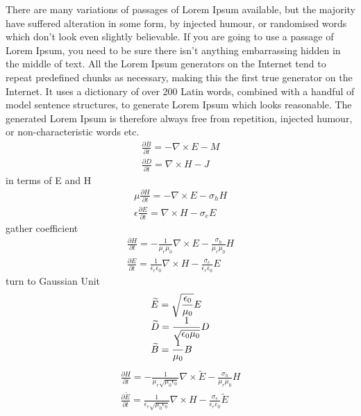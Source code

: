 There are many variations of passages of Lorem Ipsum available, but the majority have suffered alteration in some form,
by injected humour, or randomised words which don't look even slightly believable. If you are going to use a passage of
Lorem Ipsum, you need to be sure there isn't anything embarrassing hidden in the middle of text. All the Lorem Ipsum
generators on the Internet tend to repeat predefined chunks as necessary, making this the first true generator on the
Internet. It uses a dictionary of over 200 Latin words, combined with a handful of model sentence structures, to
generate Lorem Ipsum which looks reasonable. The generated Lorem Ipsum is therefore always free from repetition,
injected humour, or non-characteristic words etc.
\begin{gather}
    \frac{\partial B}{\partial t} =  - \nabla \times E - M\\
    \frac{\partial D}{\partial t} = \nabla \times H - J
\end{gather}
in terms of E and H
\begin{gather}
  \mu\frac{\partial H}{\partial t} = - \nabla \times E - \sigma_hH\\
  \epsilon\frac{\partial E}{\partial t} = \nabla \times H - \sigma_eE
\end{gather}
gather coefficient 
\begin{gather}
  \frac{\partial H}{\partial t} = - \frac{1}{\mu_r\mu_0}\nabla\times E - \frac{\sigma_h}{\mu_r\mu_0}H\\
  \frac{\partial E}{\partial t} = \frac{1}{\epsilon_r\epsilon_0}\nabla\times H - \frac{\sigma_e}{\epsilon_r\epsilon_0}E
\end{gather}
turn to Gaussian Unit 
\begin{equation}
  \label{eq:gaussian_unit}
  \begin{array}{@{}l@{}}
    {\displaystyle\widetilde{E} = \sqrt{\frac{\epsilon_0}{\mu_0}}E}\\
    {\displaystyle\widetilde{D} = \frac{1}{\sqrt{\epsilon_0\mu_0}}D}\\
    {\displaystyle\widetilde{B} = \frac{1}{\mu_0}B}
  \end{array}
\end{equation}
\begin{gather}
  \frac{\partial H}{\partial t} = - \frac{1}{\mu_r\sqrt{\mu_0\epsilon_0}}\nabla\times\widetilde{E} - \frac{\sigma_h}{\mu_r\mu_0}H\\
  \frac{\partial \widetilde{E}}{\partial t} = \frac{1}{\epsilon_r\sqrt{\mu_0\epsilon_0}}\nabla\times H - \frac{\sigma_e}{\epsilon_r\epsilon_0}\widetilde{E}
\end{gather}
